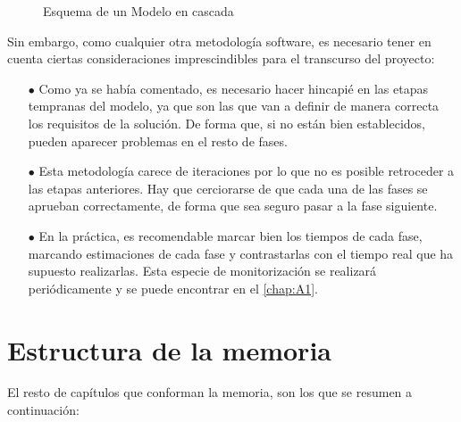 \documentclass[11pt,spanish,listoffigures,listoftables]{tfgetsinf}
\begin{document}
\begin{figure}[h!]
\caption{Esquema de un Modelo en cascada} \label{fig:M1}
\end{figure}

Sin embargo, como cualquier otra metodología software, es necesario tener en cuenta ciertas consideraciones imprescindibles para el transcurso del proyecto:

\begin{itemize}
   \item[$\bullet$] Como ya se había comentado, es necesario hacer hincapié en las etapas tempranas del modelo, ya que son
   las que van a definir de manera correcta los requisitos de la solución. De forma que, si no están bien establecidos, pueden 
   aparecer problemas en el resto de fases.
   \item[$\bullet$] Esta metodología carece de iteraciones por lo que no es posible retroceder a las etapas anteriores.
   Hay que cerciorarse de que cada una de las fases se aprueban correctamente, de forma que sea seguro pasar a la
   fase siguiente.
   \item[$\bullet$] En la práctica, es recomendable marcar bien los tiempos de cada fase, marcando estimaciones de cada fase y contrastarlas con
   el tiempo real que ha supuesto realizarlas. Esta especie de monitorización se realizará periódicamente y se puede encontrar 
   en el \autoref{chap:A1}.
\end{itemize}

\section{Estructura de la memoria} %

El resto de capítulos que conforman la memoria, son los que se resumen a continuación:
\end{document}
